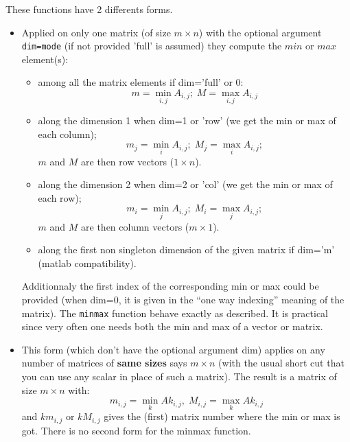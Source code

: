 \begin{mandescription}

  These functions have 2 differents forms.
\begin{itemize}
\item {}
Applied on only one matrix (of size $m \times n$) with the optional argument \verb+dim=mode+ 
(if not provided 'full' is assumed) they compute the $min$ or $max$ element(s):
  \begin{itemize}
    \item among all the matrix elements if dim='full' or 0:
     $$
           m = \min_{i,j} A_{i,j}; \; M = \max_{i,j} A_{i,j}
     $$
    \item along the dimension 1 when dim=1 or 'row' (we get the min or max of each column);
     $$
           m_j = \min_i A_{i,j}; \; M_j = \max_i A_{i,j}; 
     $$
     $m$ and $M$ are then row vectors ($1 \times n$).
    \item along the dimension 2 when dim=2 or 'col' (we get the min or max of each row);
     $$
           m_i = \min_j A_{i,j}; \; M_i = \max_j A_{i,j}; 
     $$
     $m$ and $M$ are then column vectors ($m \times 1$).
    \item along the first non singleton dimension of the given matrix if dim='m' (matlab compatibility).
  \end{itemize}
Additionnaly the first index of the corresponding min or max could be provided (when dim=0, it is 
given in the ``one way indexing'' meaning of the matrix). The \verb+minmax+ function behave exactly
as described. It is practical since very often one needs both the min and max of a vector or matrix.  
     
\item {}
  This form (which don't have the optional argument dim) applies on any number of matrices of {\bf same
  sizes} says $m \times n$ (with the usual short cut that you can use any scalar in place of such a matrix). 
  The result is a matrix of size  $m \times n$ with:
  $$
      m_{i,j} = \min_k Ak_{i,j}, \;  M_{i,j} = \max_k Ak_{i,j}
  $$
  and $km_{i,j}$ or $kM_{i,j}$ gives the (first) matrix number where the min or max is got.
  There is no second form for the minmax function.


\end{itemize}
\end{mandescription}
